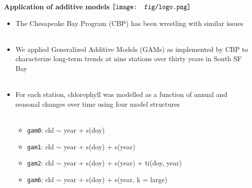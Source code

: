 \documentclass{beamer}
\begin{document}
\begin{frame}{\textbf{Application of additive models} \hspace{0pt plus 1 filll} $\vcenter{\hbox{\texttt{[image: fig/logo.png]}}}$}
\begin{itemize}
\item The Chesapeake Bay Program (CBP) has been wrestling with similar issues {\tiny \cite{Beck17,Murphy19}} \\~\\
\item We applied Generalized Additive Models (GAMs) as implemented by CBP to characterize long-term trends at nine stations over thirty years in South SF Bay \\~\\
\item For each station, chlorophyll was modelled as a function of annual and seasonal changes over time using four model structures {\tiny \cite[baytrends R package]{Murphy19b}}\\~\\
\begin{itemize}
\item \texttt{gam0}: chl $\sim$ year + s(doy)
\item \texttt{gam1}: chl $\sim$ year + s(doy) + s(year)
\item \texttt{gam2}: chl $\sim$ year + s(doy) + s(year) + ti(doy, year)
\item \texttt{gam6}: chl $\sim$ year + s(doy) + s(year, k = large)
\end{itemize}
\end{itemize}
\end{frame}
\end{document}
